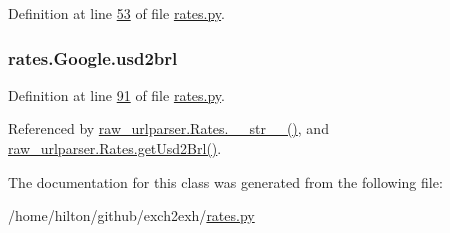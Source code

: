 Definition at line \hyperlink{rates_8py_source_l00053}{53} of file \hyperlink{rates_8py_source}{rates.\+py}.

\subsubsection[{\texorpdfstring{usd2brl}{usd2brl}}]{\setlength{\rightskip}{0pt plus 5cm}rates.\+Google.\+usd2brl}\hypertarget{classrates_1_1_google_a94c28f6d60d5d6afc075416d7378471c}{}\label{classrates_1_1_google_a94c28f6d60d5d6afc075416d7378471c}


Definition at line \hyperlink{rates_8py_source_l00091}{91} of file \hyperlink{rates_8py_source}{rates.\+py}.



Referenced by \hyperlink{raw__urlparser_8py_source_l00038}{raw\+\_\+urlparser.\+Rates.\+\_\+\+\_\+str\+\_\+\+\_\+()}, and \hyperlink{raw__urlparser_8py_source_l00032}{raw\+\_\+urlparser.\+Rates.\+get\+Usd2\+Brl()}.



The documentation for this class was generated from the following file\+:\begin{DoxyCompactItemize}
\item 
/home/hilton/github/exch2exh/\hyperlink{rates_8py}{rates.\+py}\end{DoxyCompactItemize}
